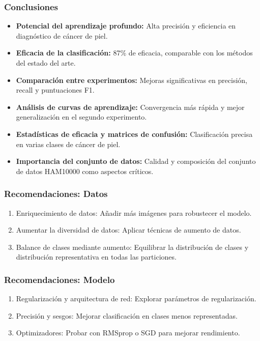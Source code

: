 \documentclass{beamer}
\begin{document}
\begin{frame}
  \frametitle{Conclusiones}
  \begin{itemize}
    \item \textbf{Potencial del aprendizaje profundo:} Alta precisión y eficiencia en diagnóstico de cáncer de piel.
    \item \textbf{Eficacia de la clasificación:} 87\% de eficacia, comparable con los métodos del estado del arte.
    \item \textbf{Comparación entre experimentos:} Mejoras significativas en precisión, recall y puntuaciones F1.
    \item \textbf{Análisis de curvas de aprendizaje:} Convergencia más rápida y mejor generalización en el segundo experimento.
    \item \textbf{Estadísticas de eficacia y matrices de confusión:} Clasificación precisa en varias clases de cáncer de piel.
    \item \textbf{Importancia del conjunto de datos:} Calidad y composición del conjunto de datos HAM10000 como aspectos críticos.
  \end{itemize}
\end{frame}

\begin{frame}
  \frametitle{Recomendaciones: Datos}
  \begin{enumerate}
    \item Enriquecimiento de datos: Añadir más imágenes para robustecer el modelo.
    \item Aumentar la diversidad de datos: Aplicar técnicas de aumento de datos.
    \item Balance de clases mediante aumento: Equilibrar la distribución de clases y distribución representativa en todas las particiones.
  \end{enumerate}
\end{frame}

\begin{frame}
  \frametitle{Recomendaciones: Modelo}
  \begin{enumerate}
    \item Regularización y arquitectura de red: Explorar parámetros de regularización.
    \item Precisión y sesgos: Mejorar clasificación en clases menos representadas.
    \item Optimizadores: Probar con RMSprop o SGD para mejorar rendimiento.
  \end{enumerate}
\end{frame}
\end{document}

